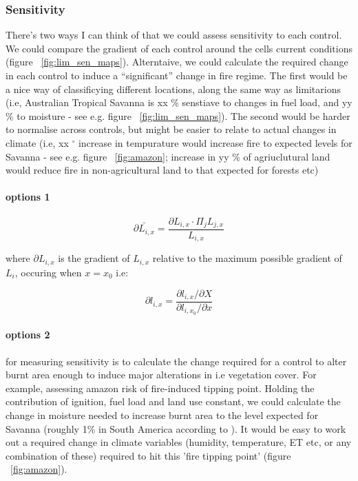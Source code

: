 \subsubsection{Sensitivity}


\begin{shaded}
    There's two ways I can think of that we could assess sensitivity to each control. We could compare the gradient of each control around the cells current conditions (figure ~\ref{fig:lim_sen_maps}). Alterntaive, we could calculate the required change in each control to induce a ``significant'' change in fire regime. The first would be a nice way of classificying different locations, along the same way as limitarions (i.e, Australian Tropical Savanna is xx \% senstiave to changes in fuel load, and yy \% to moisture - see e.g. figure ~\ref{fig:lim_sen_maps}). The second would be harder to normalise across controls, but might be easier to relate to actual changes in climate (i.e, xx $^{\circ}$ increase in tempurature would increase fire to expected levels for Savanna - see e.g. figure ~\ref{fig:amazon}; increase in yy \% of agriuclutural land would reduce fire in non-agricultural land to that expected for forests etc)

\paragraph{options 1}

\begin{equation}
    \bar{\partial L_{i, x}} = \frac{\partial L_{i, x} \cdot \Pi_{j} L_{j, x}}{L_{i, x}}
\end{equation}

where $\partial L_{i, x}$ is the gradient of $L_{i, x}$ relative to the maximum possible gradient of $L_{i}$, occuring when $x = x_{0}$ i.e:

\begin{equation}
    \partial l_{i, x} = \frac{\partial l_{i, x} / \partial X}
                             {\partial l_{i, x_{0}} / \partial x}
\end{equation}

\paragraph{options 2}
for measuring sensitivity is to calculate the change required for a control to alter burnt area enough to induce major alterations in i.e vegetation cover.
For example, assessing amazon risk of fire-induced tipping point. Holding the contribution of ignition, fuel load and land use constant, we could calculate the change in moisture needed to increase burnt area to the level expected for Savanna (roughly 1\% in South America according to \cite{lehmann2011deciphering}).
It would be easy to work out a required change in climate variables (humidity, temperature, ET etc, or any combination of these) required to hit this 'fire tipping point' (figure ~\ref{fig:amazon}).

\end{shaded}

